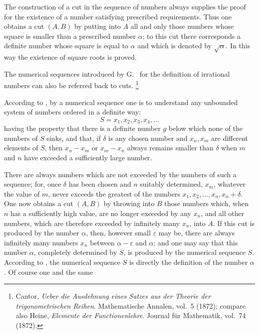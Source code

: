 
The construction of a cut in the sequence of numbers always supplies
the proof for the existence of a number satisfying prescribed
requirements. Thus one obtains a cut $(A,B)$ by putting into $A$ all
and only those numbers whose square is smaller than a prescribed number
$\alpha$; to this cut there corresponds a definite number whose square
is equal to $\alpha$ and which is denoted by $\sqrt\alpha$. In this way
the existence of square roots is proved.

The numerical sequences introduced by G.\  for the
definition of irrational numbers can also be referred back to cuts.
\setcounter{footnote}{0}\footnote{Cantor, \emph{Ueber die Ausdehnung eines Satzes aus der
Theorie der trigonometrischen Reihen}. Mathematische Annalen, vol.~5
(1872); compare also Heine, \emph{Elemente der Functionenlehre}.
Journal für Mathematik, vol.~74 (1872).}

According to , by a numerical sequence one is to
understand any unbounded system of numbers ordered in a definite way:
\[
 S=x_1,x_2,x_3,x_4,\ldots
\]
having the property that there is a definite number $g$ below which
none of the numbers of $S$ sinks, and that, if $\delta$ is any chosen
number and $x_n,x_m$ are different elements of $S$, then $x_n-x_m$ or
$x_m-x_n$ always remains smaller than $\delta$ when $m$ and $n$ have
exceeded a sufficiently large number.

There are always numbers which are not exceeded by the numbers of such
a sequence; for, once $\delta$ has been chosen and $n$ suitably
determined, $x_m$, whatever the value of $m$, never exceeds the
greatest of the numbers $x_1,x_2,\ldots,x_n,x_n+\delta$. One now
obtains a cut $(A,B)$ by throwing into $B$ those numbers which, when
$n$ has a sufficiently high value, are no longer exceeded by any
$x_n$, and all other numbers, which are therefore exceeded by
infinitely many $x_n$, into $A$. If this cut is produced by the number
$\alpha$, then, however small $\varepsilon$ may be, there are always
infinitely many numbers $x_n$ between $\alpha-\varepsilon$ and
$\alpha$; and one may say that this number $\alpha$, completely
determined by $S$, is produced by the numerical sequence $S$. According
to , the numerical sequence $S$ is directly the
definition of the number $\alpha$. Of course one and the same
